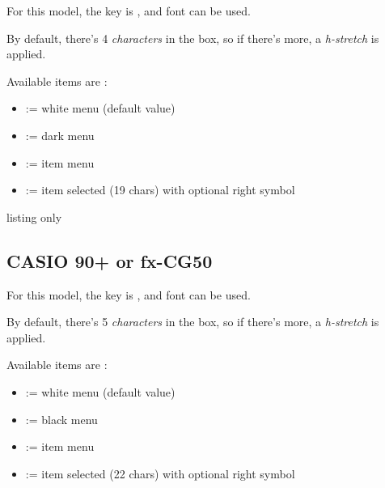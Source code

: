 \documentclass[11pt,a4paper]{ltxdoc}
\begin{document}
For this model, the key is \ShowCode{[model=35+]}, and font \ShowCode{[font=\\fontCASIOA]} can be used.

By default, there's 4 \textit{characters} in the box, so if there's more, a \textit{h-stretch} is applied.

Available items are :

\begin{itemize}[leftmargin=*]
	\item \ShowCode{[type=\{\}]} := white menu (default value) \hfill{}
	\item \ShowCode{[type=bmenu]} := dark menu \hfill{}
	\item \ShowCode{[type=item]} := item menu \hfill{}
	\item \ShowCode{[type=itemsel]} := item selected (19 chars) with optional right symbol\hfill{}
\end{itemize}

\begin{DemoCode}{listing only}
\end{DemoCode}

\subsection{CASIO 90+ or fx-CG50}

For this model, the key is \ShowCode{[model=90+]}, and font \ShowCode{[font=\\fontCASIOB]} can be used.

By default, there's 5 \textit{characters} in the box, so if there's more, a \textit{h-stretch} is applied.

Available items are :

\begin{itemize}[leftmargin=*]
	\item \ShowCode{[type=\{\}]} := white menu (default value) \hfill{}
	\item \ShowCode{[type=bmenu]} := black menu \hfill{}
	\item \ShowCode{[type=item]} := item menu \hfill{}
	\item \ShowCode{[type=itemsel]} := item selected (22 chars) with optional right symbol
	
	\hfill{}
\end{itemize}
\end{document}
